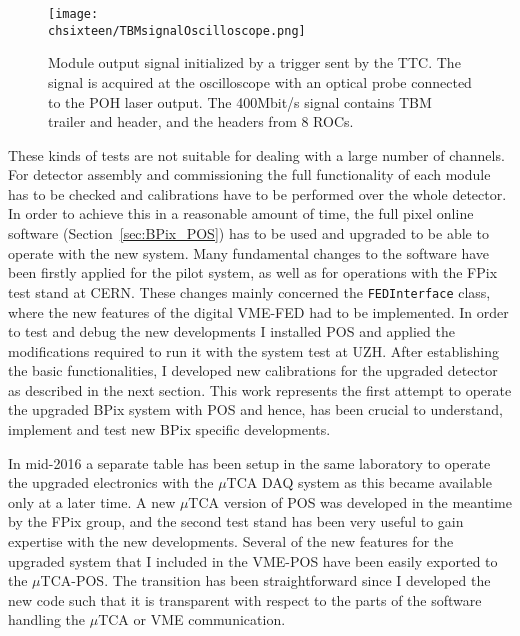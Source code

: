 \begin{figure}[!htb]
 \begin{center}
  \texttt{[image: \\chsixteen/TBMsignalOscilloscope.png]}
 \end{center}
 \caption{Module output signal initialized by a trigger sent by the TTC. The signal is acquired at the oscilloscope with an optical probe connected to the POH laser output. The 400\unit{Mbit/s} signal contains TBM trailer and header, and the headers from 8 ROCs.}
 \label{fig:TestTBM}
\end{figure} 

These kinds of tests are not suitable for dealing with a large number of channels. For detector assembly and commissioning the full functionality of each module has to be checked and calibrations have to be performed over the whole detector. In order to achieve this in a reasonable amount of time, the full pixel online software (Section~\ref{sec:BPix_POS}) has to be used and upgraded to be able to operate with the new system.
Many fundamental changes to the software have been firstly applied for the pilot system, as well as for operations with the FPix test stand at CERN.
These changes mainly concerned the \texttt{FEDInterface} class, where the new features of the digital VME-FED had to be implemented.
In order to test and debug the new developments I installed POS and applied the modifications required to run it with the system test at UZH.
After establishing the basic functionalities, I developed new calibrations for the upgraded detector as described in the next section.
This work represents the first attempt to operate the upgraded BPix system with POS and hence, has been crucial to understand, implement and test new BPix specific developments.

In mid-2016 a separate table has been setup in the same laboratory to operate the upgraded electronics with the $\mu$TCA DAQ system as this became available only at a later time.
A new $\mu$TCA version of POS was developed in the meantime by the FPix group, and the second test stand has been very useful to gain expertise with the new developments.
Several of the new features for the upgraded system that I included in the VME-POS have been easily exported to the $\mu$TCA-POS.
The transition has been straightforward since I developed the new code such that it is transparent with respect to the parts of the software handling the $\mu$TCA or VME communication.


